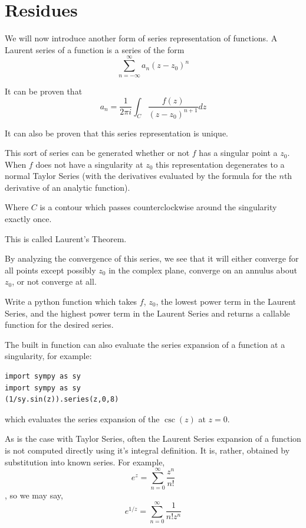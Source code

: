 \section*{Residues}

We will now introduce another form of series representation of functions. A Laurent series of a function is a series of the form $$\sum_{n= -\infty}^{\infty} a_n (z-z_0)^n$$

It can be proven that 
$$a_n = \frac{1}{2\pi i} \int_C \frac{f(z)}{(z-z_0)^{n+1}} dz$$ 

It can also be proven that this series representation is unique.

This sort of series can be generated whether or not $f$ has a singular point a $z_0$. When $f$ does not have a singularity at $z_0$ this representation degenerates to a normal Taylor Series (with the derivatives evaluated by the formula for the $n$th derivative of an analytic function). 

Where $C$ is a contour which passes counterclockwise around the singularity exactly once.

This is called Laurent's Theorem.

By analyzing the convergence of this series, we see that it will either converge for all points except possibly $z_0$ in the complex plane, converge on an annulus about $z_0$, or not converge at all.

\begin{problem}
Write a python function which takes $f$, $z_0$, the lowest power term in the Laurent Series, and the highest power term in the Laurent Series and returns a callable function for the desired series.
\end{problem}

The built in function  can also evaluate the series expansion of a function at a singularity, for example:

\begin{lstlisting}[style=python]
import sympy as sy
import sympy as sy
(1/sy.sin(z)).series(z,0,8)
\end{lstlisting}

which evaluates the series expansion of the $\csc(z)$ at $z=0$. 

As is the case with Taylor Series, often the Laurent Series expansion of a function is not computed directly using it's integral definition. It is, rather, obtained by substitution into known series. For example, 
$$e^z = \sum_{n=0}^{\infty} \frac{z^n}{n!}$$, so we may say,
$$e^{1/z} = \sum_{n=0}^{\infty} \frac{1}{n! z^n}$$

